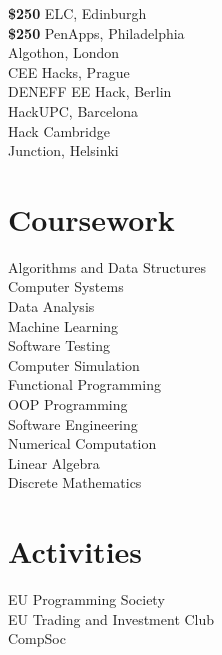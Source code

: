 \documentclass[]{deedy-resume-openfont}
\begin{document}
\begin{minipage}[t]{0.33\textwidth}
	\textbf{\$250 } ELC, Edinburgh \\
	\textbf{\$250 } PenApps, Philadelphia \\
	\textbf{ } Algothon, London \\
	\textbf{ } CEE Hacks, Prague\\
	\textbf{ } DENEFF EE Hack, Berlin\\
	\textbf{ } HackUPC, Barcelona\\
	\textbf{  } Hack Cambridge \\
	\textbf{    } Junction, Helsinki


	\section{Coursework}
	Algorithms and Data Structures \\
	Computer Systems \\
	Data Analysis \\
	Machine Learning \\
	Software Testing \\
	Computer Simulation \\
	Functional Programming \\
	OOP Programming \\
	Software Engineering \\
	Numerical Computation \\
	Linear Algebra \\
	Discrete Mathematics


	\section{Activities}
	EU Programming Society \\
	EU Trading and Investment Club \\
	CompSoc \\

\end{minipage}%
\end{document}
